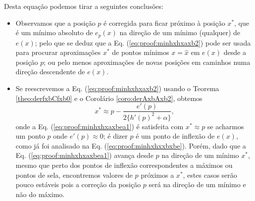 \begin{myproofT}
Desta equação podemos tirar a seguintes conclusões:


\begin{itemize}

\item Observamos que a posição $p$ é corregida para ficar próximo à posição $x^*$, 
que é um mínimo absoluto de $e_p(x)$ na direção de um mínimo (qualquer) de $e(x)$;
pelo que se deduz que a Eq. (\ref{eq:proof:minhxhxaxb2})
pode ser usada para procurar aproximações $x^*$ de pontos mínimos $x=\hat{x}$ em $e(x)$ desde a posição $p$;
ou pelo menos aproximações de novas posições em caminhos numa direção descendente de $e(x)$.

\item Se reescrevemos a Eq. (\ref{eq:proof:minhxhxaxb2}) usando o Teorema \ref{theo:derfxbCfxb0}
e o Corolário \ref{coro:derAxbAxb2},
obtemos
\begin{equation}\label{eq:proof:minhxhxaxbea1}
x^* \approx p -
\frac{ e'(p)}{2 \{h'(p)^2+\alpha\} },
\end{equation}
onde a Eq. (\ref{eq:proof:minhxhxaxbea1}) é satisfeita 
com $x^* \approx p$
se acharmos um  ponto $p$ onde  
$e'(p)\approx 0$; 
é dizer $p$ é um ponto de inflexão de $e(x)$, como já foi analisado na Eq. (\ref{eq:proof:minhxhxxbxbe}).
Porém, dado que a Eq. (\ref{eq:proof:minhxhxaxbea1}) avança desde $p$ na direção de um mínimo $x^*$, 
mesmo que perto dos pontos de inflexão correspondentes a máximos ou pontos de sela,
encontremos valores de $p$ próximos a $x^*$,
 estes casos serão pouco estáveis pois
a correção da posição $p$ será na direção de um mínimo e não do máximo.


\end{itemize}
\end{myproofT}
